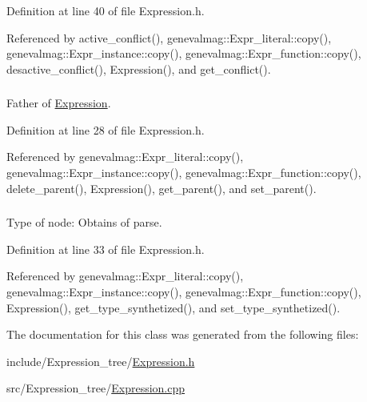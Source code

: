 Definition at line 40 of file Expression.h.



Referenced by active\_\-conflict(), genevalmag::Expr\_\-literal::copy(), genevalmag::Expr\_\-instance::copy(), genevalmag::Expr\_\-function::copy(), desactive\_\-conflict(), Expression(), and get\_\-conflict().

\hypertarget{classgenevalmag_1_1Expression_a2de0ee2801347dfd9e7b8a3a99d93233}{
\subsubsection[{parent}]{}}
\label{classgenevalmag_1_1Expression_a2de0ee2801347dfd9e7b8a3a99d93233}


Father of \hyperlink{classgenevalmag_1_1Expression}{Expression}. 



Definition at line 28 of file Expression.h.



Referenced by genevalmag::Expr\_\-literal::copy(), genevalmag::Expr\_\-instance::copy(), genevalmag::Expr\_\-function::copy(), delete\_\-parent(), Expression(), get\_\-parent(), and set\_\-parent().

\hypertarget{classgenevalmag_1_1Expression_a449dcb5bce7eb0d3c61ef6d468e6460b}{
\subsubsection[{type\_\-synthetized}]{}}
\label{classgenevalmag_1_1Expression_a449dcb5bce7eb0d3c61ef6d468e6460b}


Type of node: Obtains of parse. 



Definition at line 33 of file Expression.h.



Referenced by genevalmag::Expr\_\-literal::copy(), genevalmag::Expr\_\-instance::copy(), genevalmag::Expr\_\-function::copy(), Expression(), get\_\-type\_\-synthetized(), and set\_\-type\_\-synthetized().



The documentation for this class was generated from the following files:\begin{DoxyCompactItemize}
\item 
include/Expression\_\-tree/\hyperlink{Expression_8h}{Expression.h}\item 
src/Expression\_\-tree/\hyperlink{Expression_8cpp}{Expression.cpp}\end{DoxyCompactItemize}
